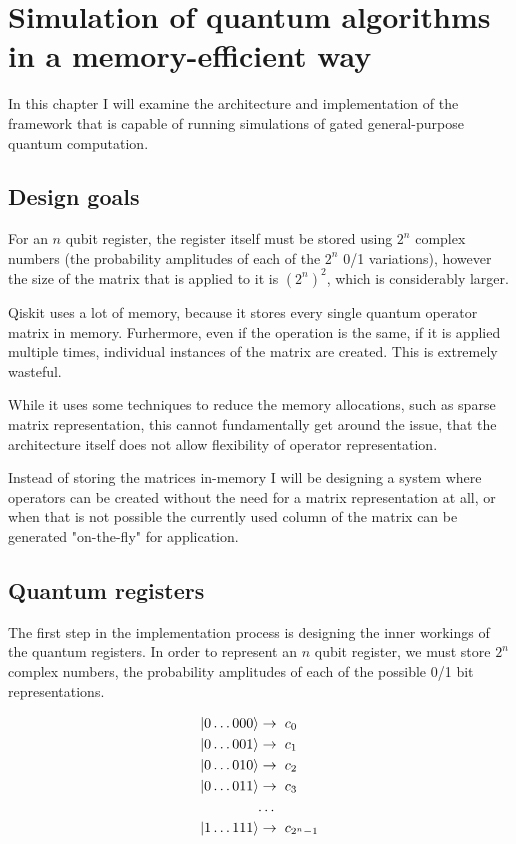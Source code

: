 \chapter{Simulation of quantum algorithms in a memory-efficient way}

In this chapter I will examine the architecture and implementation of the framework that is capable of running simulations of gated general-purpose quantum computation.

\section{Design goals}

For an $n$ qubit register, the register itself must be stored using $2^n$ complex numbers (the probability amplitudes of each of the $2^n$ 0/1 variations), however the size of the matrix that is applied to it is $(2^n)^2$, which is considerably larger.

Qiskit uses a lot of memory, because it stores every single quantum operator matrix in memory. Furhermore, even if the operation is the same, if it is applied multiple times, individual instances of the matrix are created. This is extremely wasteful.

While it uses some techniques to reduce the memory allocations, such as sparse matrix representation, this cannot fundamentally get around the issue, that the architecture itself does not allow flexibility of operator representation.

Instead of storing the matrices in-memory I will be designing a system where operators can be created without the need for a matrix representation at all, or when that is not possible the currently used column of the matrix can be generated "on-the-fly" for application.

\section{Quantum registers}

The first step in the implementation process is designing the inner workings of the quantum registers. In order to represent an $n$ qubit register, we must store $2^n$ complex numbers, the probability amplitudes of each of the possible 0/1 bit representations.

\begin{align*}
\ket{0\dots{}000} \rightarrow & \hspace{2mm} c_0 \\
\ket{0\dots{}001} \rightarrow & \hspace{2mm}  c_1 \\
\ket{0\dots{}010} \rightarrow & \hspace{2mm} c_2 \\
\ket{0\dots{}011} \rightarrow & \hspace{2mm} c_3 \\
\dots{} \\
\ket{1\dots{}111} \rightarrow & \hspace{2mm} c_{2^n-1}
\end{align*}

